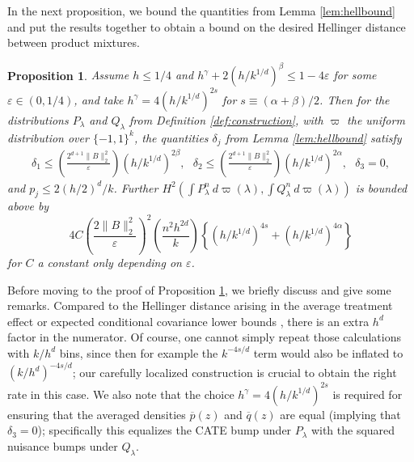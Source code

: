 \documentclass[11pt,twoside]{article}
\newtheorem{proposition}{Proposition}
\theoremstyle{definition}
\theoremstyle{remark}
\begin{document}
\bigskip

In the next proposition, we bound the quantities from Lemma  \ref{lem:hellbound} and put the results together to obtain a bound on the desired Hellinger distance between product mixtures. \\

\begin{proposition} \label{prop:hellbound}
Assume $h \leq 1/4$ and $h^\gamma + 2(h/k^{1/d})^\beta \leq 1 - 4 \varepsilon$ for some $\varepsilon \in (0,1/4)$, and take $h^\gamma = 4(h/k^{1/d})^{2s}$ for $s \equiv (\alpha+\beta)/2$. Then for the distributions $P_\lambda$ and $Q_\lambda$ from Definition \ref{def:construction}, with  $\varpi$ the uniform distribution over $\{-1,1\}^k$,  the quantities $\delta_j$ from Lemma \ref{lem:hellbound} satisfy
\begin{align*}
\delta_1 \leq \left( \frac{2^{d+1} \|B \|_2^2}{\varepsilon} \right) \left( h/k^{1/d} \right)^{2\beta} , \ \ \  \delta_2 \leq \left( \frac{2^{d+1} \|B \|_2^2}{\varepsilon} \right) \left( h/k^{1/d} \right)^{2\alpha} , \ \ \ \delta_3 = 0 , 
\end{align*}
and $ p_j \leq 2 (h/2)^d/k$. Further $H^2\left(\int P_\lambda^n \ d\varpi(\lambda), \int Q_\lambda^n \ d\varpi(\lambda) \right) $ is bounded above by
$$ 4C \left( \frac{ 2 \|B \|_2^2}{\varepsilon} \right)^2 \left( \frac{n^2 h^{2d}}{k} \right) \left\{ \left( h/k^{1/d} \right)^{4s} + \left( h/k^{1/d} \right)^{4\alpha} \right\} $$ 
for $C$ a constant only depending on $\varepsilon$.
\end{proposition}

\bigskip

Before moving to the proof of Proposition \ref{prop:hellbound}, we briefly discuss and give some remarks. Compared to the Hellinger distance arising in the average treatment effect or expected conditional covariance lower bounds \citep{robins2009semiparametric}, there is an extra $h^d$ factor in the numerator. Of course, one cannot simply repeat those calculations with $k/h^d$ bins, since then for example the $k^{-4s/d}$ term would also be inflated to $(k/h^d)^{-4s/d}$;  our carefully localized construction is crucial to obtain the right rate in this case. We also note that the choice $h^\gamma = 4(h/k^{1/d})^{2s}$ is required for ensuring that the averaged densities $\overline{p}(z)$ and $\overline{q}(z)$ are equal (implying that $\delta_3=0$); specifically this equalizes the CATE bump under $P_\lambda$ with the squared nuisance bumps under $Q_\lambda$. \\
\end{document}
